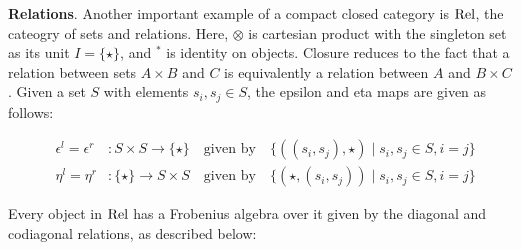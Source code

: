 
\medskip
\noindent
{\bf Relations}.
Another important example of a  compact closed category is
$\mathrm{Rel}$, the cateogry of sets and relations. Here, $\otimes$ is
cartesian product with the singleton set as its unit $I = \{\star\}$, and $^*$ is identity on objects. Closure reduces to the
fact that a relation between sets $A\times B$ and $C$ is equivalently a relation between $A$ and $B \times C$.   Given a set $S$ with elements $s_i, s_j \in S$,  the epsilon and eta maps are given as follows:

\begin{eqnarray*}
&\epsilon^l  =  \epsilon^r &\colon   S \times S \to \{\star\} \quad \mbox{given by} \quad
\{((s_i, s_j), \star) \mid s_i, s_j \in S, i = j \}\\
&\eta^l = \eta^r& \colon   \{\star\}  \to S \times S
\quad \mbox{given by} \quad 
\{(\star, (s_i, s_j)) \mid s_i, s_j \in S, i = j\}
\end{eqnarray*}



Every object in $\mathrm{Rel}$  has a
Frobenius algebra over it given by the diagonal and codiagonal
relations, as described below: 




